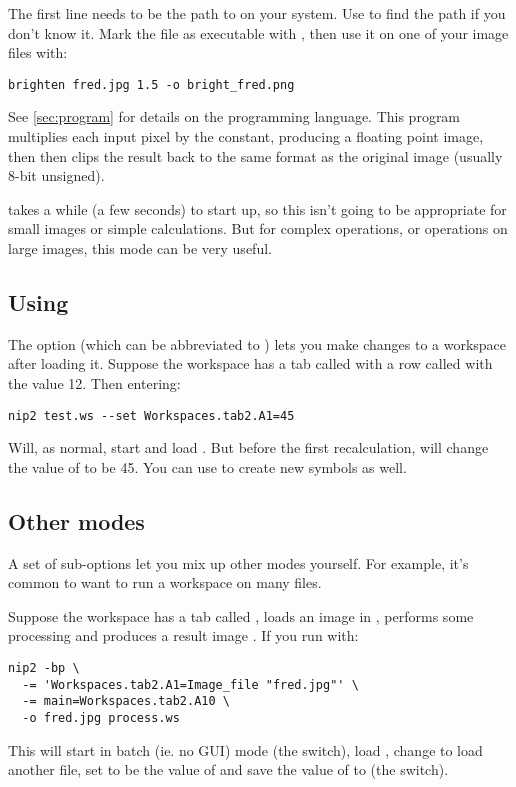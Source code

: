 \noindent
The first line needs to be the path to \nip{} on your system. Use  to find the path if you don't know it. Mark the file as executable with
, then use it on one of your image files with:

\begin{verbatim}
brighten fred.jpg 1.5 -o bright_fred.png
\end{verbatim}

\noindent
See \cref{sec:program} for details on the programming language. This program
multiplies each input pixel by the constant, producing a floating point image,
then then clips the result back to the same format as the original image
(usually 8-bit unsigned).

\nip{} takes a while (a few seconds) to start up, so this isn't going to be
appropriate for small images or simple calculations. But for complex
operations, or operations on large images, this mode can be very useful.

\subsection{Using }

The  option (which can be abbreviated to \ct{-=}) lets you make
changes to a workspace after loading it.  Suppose the workspace 
has a tab called  with a row called  with the value 12.  
Then entering:

\begin{verbatim}
nip2 test.ws --set Workspaces.tab2.A1=45
\end{verbatim}

\noindent
Will, as normal, start \nip{} and load . But before the first
recalculation, \nip{} will change the value of  to be 45.  You can
use  to create new symbols as well.

\subsection{Other modes}

A set of sub-options let you mix up other modes yourself. For example, it's
common to want to run a workspace on many files.

Suppose the workspace  has a tab called , loads
an image in , performs some processing and produces a result image
. If you run \nip{} with:

\begin{verbatim}
nip2 -bp \
  -= 'Workspaces.tab2.A1=Image_file "fred.jpg"' \
  -= main=Workspaces.tab2.A10 \
  -o fred.jpg process.ws
\end{verbatim}

\noindent
This will start \nip{} in batch (ie. no GUI) mode (the  switch), 
load , change  to load another file, set 
to be the value of  and save the value of  to  
(the \ct{-p} switch).

